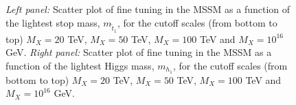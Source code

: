 \documentclass[preprint,amsmath,amssymb,aps,superscriptaddress,prd,showpacs,floatfix,nofootinbib]{revtex4-1}
\begin{document}
\begin{figure}[h]
\begin{center}
\caption{\textit{Left panel:} Scatter plot of fine tuning in the MSSM as a function of
the lightest stop mass, $m_{\tilde{t}_1}$, for the cutoff scales (from 
bottom to top) $M_X=20$ TeV, $M_X=50$ TeV, $M_X=100$ TeV and $M_X=10^{16}$ GeV. 
\textit{Right panel:} Scatter plot of fine tuning in the MSSM as a function of
the lightest Higgs mass, $m_{h_1}$, for the cutoff scales (from 
bottom to top) $M_X=20$ TeV, $M_X=50$ TeV, $M_X=100$ TeV and $M_X=10^{16}$ GeV.}
\label{Fig:mssmstoptuning}
\end{center}
\end{figure}
\end{document}
